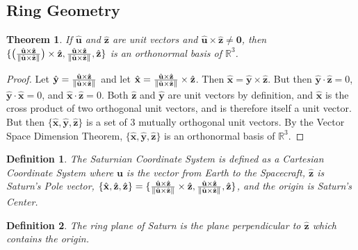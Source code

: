 \documentclass{article}
\theoremstyle{mystyle}
\newtheorem{theorem}{Theorem}[section]
\newtheorem{definition}{Definition}[section]
\DeclarePairedDelimiter\norm{\lVert}{\rVert}
\begin{document}
\subsection{Ring Geometry}
\begin{theorem}
\label{theorem:ring_occ_geom_x_y_z_orthonormal_basis}
If $\hat{\mathbf{u}}$ and $\hat{\mathbf{z}}$ are unit vectors and $\hat{\mathbf{u}}\times \hat{\mathbf{z}} \ne \mathbf{0}$, then $\{\big(\frac{\hat{\mathbf{u}}\times \hat{\mathbf{z}}}{\norm{\hat{\mathbf{u}}\times \hat{\mathbf{z}}}}\big)\times \hat{\mathbf{z}},\frac{\hat{\mathbf{u}}\times \hat{\mathbf{z}}}{\norm{\hat{\mathbf{u}}\times \hat{\mathbf{z}}}},\hat{\mathbf{z}}\}$ is an orthonormal basis of $\mathbb{R}^3$.
\end{theorem}
\begin{proof}
Let $\hat{\mathbf{y}} = \frac{\hat{\mathbf{u}}\times \hat{\mathbf{z}}}{\norm{\hat{\mathbf{u}}\times \hat{\mathbf{z}}}}$ and let $\hat{\mathbf{x}} = \frac{\hat{\mathbf{u}}\times \hat{\mathbf{z}}}{\norm{\hat{\mathbf{u}}\times \hat{\mathbf{z}}}}\times \hat{\mathbf{z}}$. Then $\hat{\mathbf{x}} = \hat{\mathbf{y}}\times \hat{\mathbf{z}}$. But then $\hat{\mathbf{y}}\cdot \hat{\mathbf{z}} = 0$, $\hat{\mathbf{y}}\cdot \hat{\mathbf{x}} = 0$, and $\hat{\mathbf{x}}\cdot \hat{\mathbf{z}} = 0$. Both $\hat{\mathbf{z}}$ and $\hat{\mathbf{y}}$ are unit vectors by definition, and $\hat{\mathbf{x}}$ is the cross product of two orthogonal unit vectors, and is therefore itself a unit vector. But then $\{\hat{\mathbf{x}},\hat{\mathbf{y}},\hat{\mathbf{z}}\}$ is a set of $3$ mutually orthogonal unit vectors. By the Vector Space Dimension Theorem, $\{\hat{\mathbf{x}},\hat{\mathbf{y}},\hat{\mathbf{z}}\}$ is an orthonormal basis of $\mathbb{R}^3$.
\end{proof}
\begin{definition}
The Saturnian Coordinate System is defined as a Cartesian Coordinate System where $\mathbf{u}$ is the vector from Earth to the Spacecraft, $\hat{\mathbf{z}}$ is Saturn's Pole vector, $\{\hat{\mathbf{x}},\hat{\mathbf{z}},\hat{\mathbf{z}}\} = \{\frac{\hat{\mathbf{u}}\times\hat{\mathbf{z}}}{\norm{\hat{\mathbf{u}}\times\hat{\mathbf{z}}}}\times\hat{\mathbf{z}},\frac{\hat{\mathbf{u}}\times\hat{\mathbf{z}}}{\norm{\hat{\mathbf{u}}\times\hat{\mathbf{z}}}},\hat{\mathbf{z}}\}$, and the origin is Saturn's Center.
\end{definition}
\begin{definition}
The ring plane of Saturn is the plane perpendicular to $\hat{\mathbf{z}}$ which contains the origin.
\end{definition}
\end{document}
